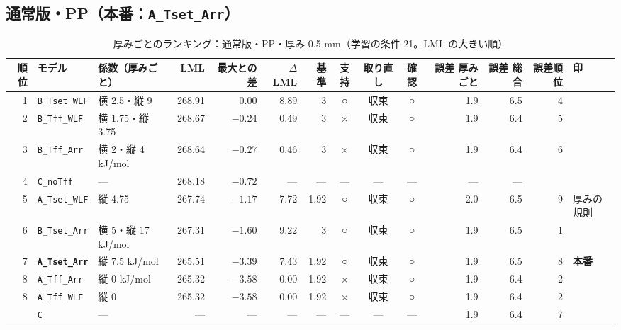 \documentclass[paper=a4paper,landscape,fontsize=10pt,line_length=62zw,number_of_lines=34]{jlreq}
\let\origtextbf\textbf
\renewcommand{\textbf}[1]{\origtextbf{\gtfamily #1}}   %
\begin{document}
\subsection{通常版・PP（本番：\texttt{A\_\allowbreak{}Tset\_\allowbreak{}Arr}）}
\begin{table}[H]\centering\footnotesize
\caption{厚みごとのランキング：通常版・PP・厚み 0.5 mm（学習の条件 21。LML の大きい順）}
\begin{tabular}{rlp{11\zw}rrrrccc rrrl}
\toprule
順位 & モデル & 係数（厚みごと） & LML & 最大との差 & $\Delta$LML & 基準 & 支持 & 取り直し & 確認 & 誤差 厚みごと & 誤差 総合 & 誤差順位 & 印 \\
\midrule
1 & \texttt{B\_\allowbreak{}Tset\_\allowbreak{}WLF} & 横 2.5・縦 9 & 268.91 & 0.00 & 8.89 & 3 & ○ & 収束 & ○ & 1.9 & 6.5 & 4 &  \\
2 & \texttt{B\_\allowbreak{}Tff\_\allowbreak{}WLF} & 横 1.75・縦 3.75 & 268.67 & $-0.24$ & 0.49 & 3 & × & 収束 & ○ & 1.9 & 6.4 & 5 &  \\
3 & \texttt{B\_\allowbreak{}Tff\_\allowbreak{}Arr} & 横 2・縦 4 kJ/mol & 268.64 & $-0.27$ & 0.46 & 3 & × & 収束 & ○ & 1.9 & 6.4 & 6 &  \\
4 & \texttt{C\_\allowbreak{}noTff} & --- & 268.18 & $-0.72$ & --- & --- & --- & --- & --- & --- & --- &  &  \\
5 & \texttt{A\_\allowbreak{}Tset\_\allowbreak{}WLF} & 縦 4.75 & 267.74 & $-1.17$ & 7.72 & 1.92 & ○ & 収束 & ○ & 2.0 & 6.5 & 9 & 厚みの規則 \\
6 & \texttt{B\_\allowbreak{}Tset\_\allowbreak{}Arr} & 横 5・縦 17 kJ/mol & 267.31 & $-1.60$ & 9.22 & 3 & ○ & 収束 & ○ & 1.9 & 6.5 & 1 &  \\
7 & \textbf{\texttt{A\_\allowbreak{}Tset\_\allowbreak{}Arr}} & 縦 7.5 kJ/mol & 265.51 & $-3.39$ & 7.43 & 1.92 & ○ & 収束 & ○ & 1.9 & 6.5 & 8 & \textbf{本番} \\
8 & \texttt{A\_\allowbreak{}Tff\_\allowbreak{}Arr} & 縦 0 kJ/mol & 265.32 & $-3.58$ & 0.00 & 1.92 & × & 収束 & ○ & 1.9 & 6.4 & 2 &  \\
8 & \texttt{A\_\allowbreak{}Tff\_\allowbreak{}WLF} & 縦 0 & 265.32 & $-3.58$ & 0.00 & 1.92 & × & 収束 & ○ & 1.9 & 6.4 & 2 &  \\
 & \texttt{C} & --- & --- & --- & --- & --- & --- & --- & --- & 1.9 & 6.4 & 7 &  \\
\bottomrule
\end{tabular}
\end{table}
\end{document}
